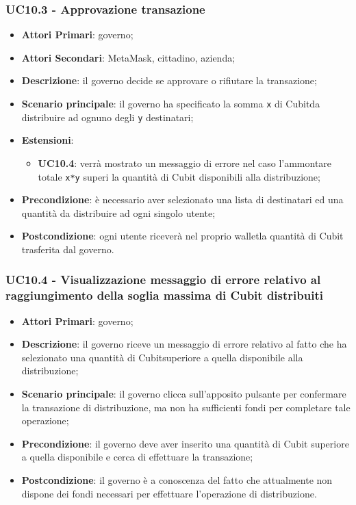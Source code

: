 \subsubsection{UC10.3 - Approvazione transazione}
\begin{itemize}
	\item \textbf{Attori Primari}: governo;
	\item \textbf{Attori Secondari}: MetaMask\glo, cittadino, azienda\glo;
	\item \textbf{Descrizione}: il governo decide se approvare o rifiutare la transazione;
	\item \textbf{Scenario principale}: il governo ha specificato la somma \texttt{x} di Cubit\glosp da distribuire ad ognuno degli \texttt{y} destinatari;
	\item \textbf{Estensioni}:
	\begin{itemize}
		\item \textbf{UC10.4}: verrà mostrato un messaggio di errore nel caso l'ammontare totale \texttt{x*y} superi la quantità di Cubit disponibili alla distribuzione;
	\end{itemize}
	\item \textbf{Precondizione}: è necessario aver selezionato una lista di destinatari ed una quantità da distribuire ad ogni singolo utente;
	\item \textbf{Postcondizione}: ogni utente riceverà nel proprio wallet\glosp la quantità di Cubit trasferita dal governo.
\end{itemize}
\subsubsection{UC10.4 - Visualizzazione messaggio di errore relativo al raggiungimento della soglia massima di Cubit distribuiti}
\begin{itemize}
	\item \textbf{Attori Primari}: governo;
	\item \textbf{Descrizione}: il governo riceve un messaggio di errore relativo al fatto che ha selezionato una quantità di Cubit\glosp superiore a quella disponibile alla distribuzione;
	\item \textbf{Scenario principale}: il governo clicca sull'apposito pulsante per confermare la transazione di distribuzione, ma non ha sufficienti fondi per completare tale operazione;
	\item \textbf{Precondizione}: il governo deve aver inserito una quantità di Cubit superiore a quella disponibile e cerca di effettuare la transazione;
	\item \textbf{Postcondizione}: il governo è a conoscenza del fatto che attualmente non dispone dei fondi necessari per effettuare l'operazione di distribuzione.
	
\end{itemize} 

